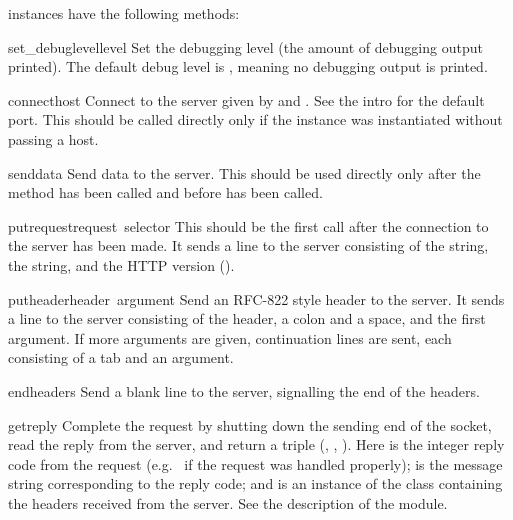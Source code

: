  instances have the following methods:

\begin{funcdesc}{set_debuglevel}{level}
Set the debugging level (the amount of debugging output printed).
The default debug level is , meaning no debugging output is
printed.
\end{funcdesc}

\begin{funcdesc}{connect}{host}
Connect to the server given by  and .  See the
intro for the default port.  This should be called directly only if
the instance was instantiated without passing a host.
\end{funcdesc}

\begin{funcdesc}{send}{data}
Send data to the server.  This should be used directly only after the
 method has been called and before
 has been called.
\end{funcdesc}

\begin{funcdesc}{putrequest}{request\, selector}
This should be the first call after the connection to the server has
been made.  It sends a line to the server consisting of the
 string, the  string, and the HTTP version
().
\end{funcdesc}

\begin{funcdesc}{putheader}{header\, argument}
Send an RFC-822 style header to the server.  It sends a line to the
server consisting of the header, a colon and a space, and the first
argument.  If more arguments are given, continuation lines are sent,
each consisting of a tab and an argument.
\end{funcdesc}

\begin{funcdesc}{endheaders}{}
Send a blank line to the server, signalling the end of the headers.
\end{funcdesc}

\begin{funcdesc}{getreply}{}
Complete the request by shutting down the sending end of the socket,
read the reply from the server, and return a triple (,
, ).  Here  is the integer
reply code from the request (e.g.\  if the request was
handled properly);  is the message string corresponding
to the reply code; and  is an instance of the class
 containing the headers received from the server.
See the description of the  module.
\end{funcdesc}

